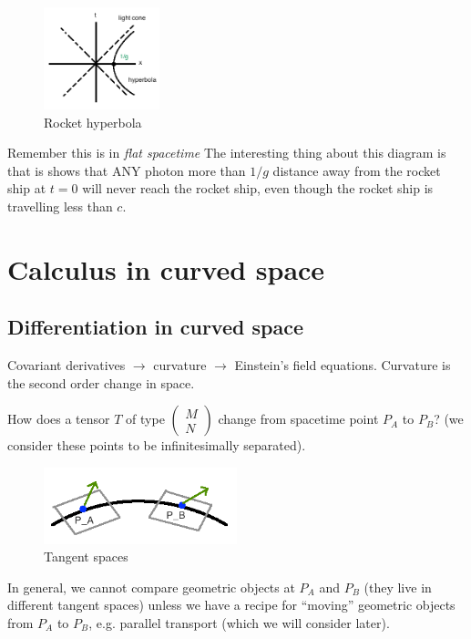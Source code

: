 \documentclass[a4paper]{article} %
\newcommand{\pmx}[1]{
\begin{pmatrix}
#1
\end{pmatrix}
}
\begin{document}
\begin{figure}[h]
\centering
\includegraphics[width=0.3\textwidth]{images/rocket_hyperbola.png}
\caption{Rocket hyperbola}
\end{figure}

Remember this is in \emph{flat spacetime} The interesting thing about this diagram is that is shows that ANY photon more than $1/g$ distance away from the rocket ship at $t=0$ will never reach the rocket ship, even though the rocket ship is travelling less than $c$.


\section{Calculus in curved space}

\subsection{Differentiation in curved space}
Covariant derivatives $\to$ curvature $\to$ Einstein's field equations. Curvature is the second order change in space.

How does a tensor $T$ of type $\pmx{M\\N}$ change from spacetime point $P_A$ to $P_B$? (we consider these points to be infinitesimally separated).

\begin{figure}[h]
\centering
\includegraphics[width=0.5\textwidth]{images/tangent-spaces.png}
\caption{Tangent spaces}
\end{figure}

In general, we cannot compare geometric objects at $P_A$ and $P_B$ (they live in different tangent spaces) unless we have a recipe for ``moving'' geometric objects from $P_A$ to $P_B$, e.g. parallel transport (which we will consider later).
\end{document}
